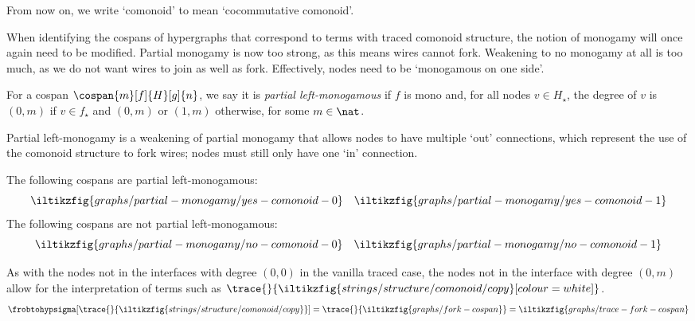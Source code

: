 

From now on, we write `comonoid' to mean `cocommutative comonoid'.

When identifying the cospans of hypergraphs that correspond to terms with traced
comonoid structure, the notion of monogamy will once again need to be modified.
Partial monogamy is now too strong, as this means wires cannot fork.
Weakening to no monogamy at all is too much, as we do not want wires to join as
well as fork.
Effectively, nodes need to be `monogamous on one side'.

\begin{definition}
    For a cospan \(\cospan{m}[f]{H}[g]{n}\), we say it is
    \emph{partial left-monogamous} if \(f\) is mono and, for all nodes
    \(v \in H_\star\), the degree of \(v\) is \((0,m)\) if \(v \in f_\star\) and
    \((0,m)\) or \((1,m)\) otherwise, for some \(m \in \nat\).
\end{definition}

Partial left-monogamy is a weakening of partial monogamy that allows nodes
to have multiple `out' connections, which represent the use of the comonoid
structure to fork wires; nodes must still only have one `in' connection.

\begin{example}\label{ex:partial-left-monogamous}
    The following cospans are partial left-monogamous:
    \[
        \iltikzfig{graphs/partial-monogamy/yes-comonoid-0}
        \quad
        \iltikzfig{graphs/partial-monogamy/yes-comonoid-1}
    \]
    The following cospans are not partial left-monogamous:
    \[
        \iltikzfig{graphs/partial-monogamy/no-comonoid-0}
        \quad
        \iltikzfig{graphs/partial-monogamy/no-comonoid-1}
    \]
\end{example}

\begin{remark}
    As with the nodes not in the interfaces with degree \((0, 0)\) in the
    vanilla traced case, the nodes not in the interface with degree
    \((0, m)\) allow for the interpretation of terms such as \(
    \trace{}{\iltikzfig{strings/structure/comonoid/copy}[colour=white]}
    \).
    \begin{gather*}
        \frobtohypsigma[\trace{}{\iltikzfig{strings/structure/comonoid/copy}}]
        =
        \trace{}{\iltikzfig{graphs/fork-cospan}}
        =
        \iltikzfig{graphs/trace-fork-cospan}
    \end{gather*}
\end{remark}

